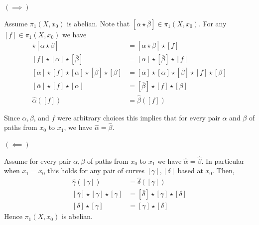 \documentclass[12pt]{article}
\begin{document}
\begin{solution}
    \bbni 

    $(\implies)$ 

    Assume $\pi_1(X, x_0)$ is abelian. Note that $[\alpha \star \overline{\beta}] \in \pi_1(X, x_0)$. 
    For any $[f] \in \pi_1(X, x_0)$ we have
    \begin{align*}
        [f] \star [\alpha \star \overline{\beta}] &= [\alpha \star \overline{\beta}] \star [f] \\
        [f] \star [\alpha] \star [\overline{\beta}] &= [\alpha] \star [\overline{\beta}] \star [f] \\
        [\overline{\alpha}]\star[f] \star [\alpha] \star [\overline{\beta}]\star [\beta] &= [\overline{\alpha}]\star[\alpha] \star [\overline{\beta}] \star [f] \star [\beta]\\
        [\overline{\alpha}] \star [f] \star [\alpha] &= [\overline{\beta}] \star [f] \star [\beta]\\
        \widehat{\alpha}([f]) &=  \widehat{\beta}([f])
    \end{align*}

    Since $\alpha, \beta$, and $f$ were arbitrary choices this implies that for every pair $\alpha$ and $\beta$ of paths from $x_0$ to $x_1$, we have $\widehat{\alpha} = \widehat{\beta}$. 

    $(\impliedby)$

    Assume for every pair $\alpha, \beta$ of paths from $x_0$ to $x_1$ we have $\widehat{\alpha} = \widehat{\beta}$. In particular when $x_1 = x_0$ this holds for any pair of curves $[\gamma], [\delta]$ based at $x_0$. Then, 
    \begin{align*}
        \widehat{\gamma} ([\gamma]) &= \widehat{\delta}([\gamma]) \\
        [\overline{\gamma}] \star [\gamma] \star [\gamma] &= [\overline{\delta}] \star [\gamma]\star[\delta] \\ 
        [\delta] \star [\gamma] &= [\gamma] \star [\delta]
    \end{align*}
    Hence $\pi_1(X, x_0)$ is abelian. 

\end{solution}
\end{document}
